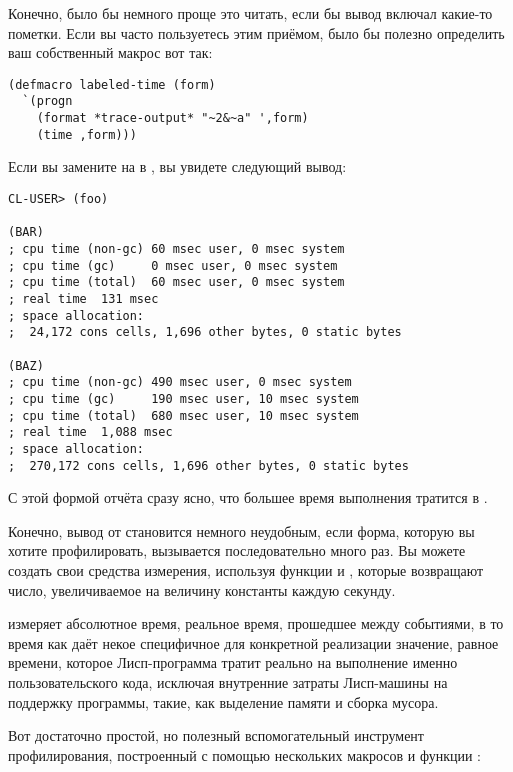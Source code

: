 Конечно, было бы немного проще это читать, если бы вывод включал какие-то пометки. Если вы
часто пользуетесь этим приёмом, было бы полезно определить ваш собственный макрос вот так:

\begin{lstlisting}
(defmacro labeled-time (form)
  `(progn
    (format *trace-output* "~2&~a" ',form)
    (time ,form)))
\end{lstlisting}

Если вы замените  на  в , вы увидете следующий
вывод:

\begin{lstlisting}
CL-USER> (foo)

(BAR)
; cpu time (non-gc) 60 msec user, 0 msec system
; cpu time (gc)     0 msec user, 0 msec system
; cpu time (total)  60 msec user, 0 msec system
; real time  131 msec
; space allocation:
;  24,172 cons cells, 1,696 other bytes, 0 static bytes

(BAZ)
; cpu time (non-gc) 490 msec user, 0 msec system
; cpu time (gc)     190 msec user, 10 msec system
; cpu time (total)  680 msec user, 10 msec system
; real time  1,088 msec
; space allocation:
;  270,172 cons cells, 1,696 other bytes, 0 static bytes
\end{lstlisting}

С этой формой отчёта сразу ясно, что большее время выполнения  тратится в
.

Конечно, вывод от  становится немного неудобным, если форма, которую вы хотите
профилировать, вызывается последовательно много раз. Вы можете создать свои средства
измерения, используя функции  и ,
которые возвращают число, увеличиваемое на величину константы
 каждую секунду.

 измеряет абсолютное время, реальное время, прошедшее между
событиями, в то время как  даёт некое специфичное для
конкретной реализации значение, равное времени, которое Лисп-программа тратит реально на
выполнение именно пользовательского кода, исключая внутренние затраты Лисп-машины на
поддержку программы, такие, как выделение памяти и сборка мусора.

Вот достаточно простой, но полезный вспомогательный инструмент профилирования, построенный
с помощью нескольких макросов и функции :

